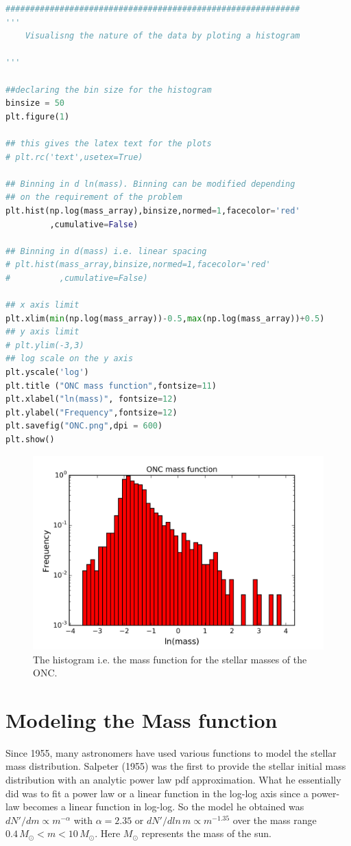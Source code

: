 \documentclass{article}
\begin{document}
\begin{lstlisting}[language=Python, caption=Python example]
############################################################
'''
    Visualisng the nature of the data by ploting a histogram

'''

##declaring the bin size for the histogram
binsize = 50                              
plt.figure(1)

## this gives the latex text for the plots
# plt.rc('text',usetex=True)               

## Binning in d ln(mass). Binning can be modified depending 
## on the requirement of the problem
plt.hist(np.log(mass_array),binsize,normed=1,facecolor='red'
         ,cumulative=False) 

## Binning in d(mass) i.e. linear spacing
# plt.hist(mass_array,binsize,normed=1,facecolor='red'
#          ,cumulative=False) 

## x axis limit
plt.xlim(min(np.log(mass_array))-0.5,max(np.log(mass_array))+0.5) 
## y axis limit
# plt.ylim(-3,3)       
## log scale on the y axis
plt.yscale('log')                         
plt.title ("ONC mass function",fontsize=11)
plt.xlabel("ln(mass)", fontsize=12)
plt.ylabel("Frequency",fontsize=12)
plt.savefig("ONC.png",dpi = 600)
plt.show()
\end{lstlisting}



     \begin{figure}
	\centering
        \includegraphics[]{ONC.png}
	\caption{The histogram i.e. the mass function for the stellar masses of the ONC.}
      \end{figure}

\section{Modeling the Mass function }
Since 1955, many astronomers have used various functions to model the stellar mass distribution. Salpeter (1955) was the first to provide the stellar initial mass distribution with an analytic power law pdf approximation. What he essentially did was to fit a power law or a linear function in the log-log axis since a power-law becomes a linear function in log-log. So the model he obtained was  $dN'/dm \propto m^{-\alpha}$ with $\alpha = 2.35$ or $dN'/dln\,m \propto m^{-1.35}$ over the mass range $0.4\,M_{\odot}< m<10\,M_{\odot}$. Here $M_{\odot}$ represents the mass of the sun. 
\end{document}
